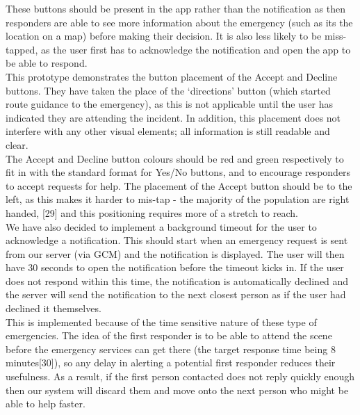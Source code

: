\documentclass{article}
\begin{document}
These buttons should be present in the app rather than the notification as then responders are able to see more information about the emergency (such as its the location on a map) before making their decision. It is also less likely to be miss-tapped, as the user first has to acknowledge the notification and open the app to be able to respond.\\

This prototype demonstrates the button placement of the Accept and Decline buttons. They have taken the place of the ‘directions’ button (which started route guidance to the emergency), as this is not applicable until the user has indicated they are attending the incident. In addition, this placement does not interfere with any other visual elements; all information is still readable and clear.\\

The Accept and Decline button colours should be red and green respectively to fit in with the standard format for Yes/No buttons, and to encourage responders to accept requests for help. The placement of the Accept button should be to the left, as this makes it harder to mis-tap - the majority of the population are right handed, [29] and this positioning requires more of a stretch to reach.\\

We have also decided to implement a background timeout for the user to acknowledge a notification. This should start when an emergency request is sent from our server (via GCM) and the notification is displayed. The user will then have 30 seconds to open the notification before the timeout kicks in. If the user does not respond within this time, the notification is automatically declined and the server will send the notification to the next closest person as if the user had declined it themselves.\\

This is implemented because of the time sensitive nature of these type of emergencies. The idea of the first responder is to be able to attend the scene before the emergency services can get there (the target response time being 8 minutes[30]), so any delay in alerting a potential first responder reduces their usefulness. As a result, if the first person contacted does not reply quickly enough then our system will discard them and move onto the next person who might be able to help faster.\\
\end{document}
